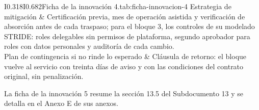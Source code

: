 \documentclass[formulario]{../../comun/overfore}
\begin{document}
\begin{tabla}{I{0.318}I{0.682}}{Ficha de la innovación 4.}{tab:ficha-innovacion-4}
Estrategia de mitigación & Certificación previa, mes de operación asistida y verificación de absorción antes de cada traspaso; para el bloque 3, los controles de su modelado STRIDE: roles delegables sin permisos de plataforma, segundo aprobador para roles con datos personales y auditoría de cada cambio. \\
Plan de contingencia si no rinde lo esperado & Cláusula de retorno: el bloque vuelve al servicio con treinta días de aviso y con las condiciones del contrato original, sin penalización. \\
\end{tabla}

La ficha de la innovación 5 resume la sección 13.5 del Subdocumento 13 y se detalla en el Anexo E de sus anexos.
\end{document}
